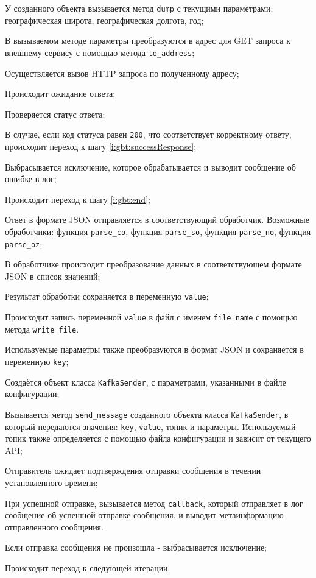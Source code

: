 \begin{enumerate_step}
    \item У созданного объекта вызывается метод \texttt{dump} с текущими параметрами: географическая широта, географическая долгота, год;
    \item В вызываемом методе параметры преобразуются в адрес для GET запроса к внешнему сервису с помощью метода \texttt{to\_address};
    \item Осуществляется вызов HTTP запроса по полученному адресу;
    \item Происходит ожидание ответа;
    \item Проверяется статус ответа;
    \item В случае, если код статуса равен \texttt{200}, что соответствует корректному ответу, происходит переход к шагу \ref{i:gbt:successResponse};
    \item Выбрасывается исключение, которое обрабатывается и выводит сообщение об ошибке в лог;
    \item Происходит переход к шагу \ref{i:gbt:end};
    \item \label{i:gbt:successResponse} Ответ в формате JSON отправляется в соответствующий обработчик. 
    Возможные обработчики: функция \texttt{parse\_co}, функция \texttt{parse\_so}, функция \texttt{parse\_no}, функция \texttt{parse\_oz};
    \item В обработчике происходит преобразование данных в соответствующем формате JSON в список значений;
    \item Результат обработки сохраняется в переменную \texttt{value};
    \item Происходит запись переменной \texttt{value} в файл с именем \texttt{file\_name} с помощью метода \texttt{write\_file}.
    \item \label{i:gbt:sendMessage} Используемые параметры также преобразуются в формат JSON и сохраняется в переменную \texttt{key};
    \item Создаётся объект класса \texttt{KafkaSender}, с параметрами, указанными в файле конфигурации;
    \item Вызывается метод \texttt{send\_message} созданного объекта класса \texttt{KafkaSender}, в который передаются значения: \texttt{key}, \texttt{value}, топик и параметры. 
    Используемый топик также определяется с помощью файла конфигурации и зависит от текущего API;
    \item Отправитель ожидает подтверждения отправки сообщения в течении установленного времени;
    \item При успешной отправке, вызывается метод \texttt{callback}, который отправляет в лог сообщение об успешной отправке сообщения, и выводит метаинформацию отправленного сообщения.
    \item Если отправка сообщения не произошла - выбрасывается исключение;
    \item \label{i:gbt:end} Происходит переход к следующей итерации.
\end{enumerate_step}

